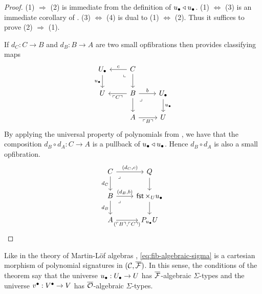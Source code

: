 \begin{proof}
  (1) $\Rightarrow$ (2) is immediate from the definition of ${u_\bullet} \triangleleft {u_\bullet}$.
  (1) $\Leftrightarrow$ (3) is an immediate corollary of
  .
  (3) $\Leftrightarrow$ (4) is dual to (1) $\Leftrightarrow$ (2).
  Thus it suffices to prove (2) $\Rightarrow$ (1).
  
  If $d_C : C \to B$ and $d_B : B \to A$
  are two small opfibrations
  then  provides classifying maps
  \[ \begin{tikzcd}
    \Ulow & C & \\
    \U & B & \Ulow \\
    & A & \U
    \arrow["\ulow"', from=1-1, to=2-1]
    \arrow["c"', from=1-2, to=1-1]
    \arrow["\lrcorner"{anchor=center, pos=0.125, rotate=-90}, draw=none, from=1-2, to=2-1]
    \arrow[from=1-2, to=2-2]
    \arrow["{\ulcorner C \urcorner}", from=2-2, to=2-1]
    \arrow["b", from=2-2, to=2-3]
    \arrow[from=2-2, to=3-2]
    \arrow["\lrcorner"{anchor=center, pos=0.125}, draw=none, from=2-2, to=3-3]
    \arrow["\ulow", from=2-3, to=3-3]
    \arrow["{\ulcorner B \urcorner}"', from=3-2, to=3-3]
  \end{tikzcd} \]
  By applying the universal property of polynomials from
  ,
  we have that the composition $d_B \circ d_A : C \to A$ 
  is a pullback of ${u_\bullet} \triangleleft {u_\bullet}$.
  Hence $d_B \circ d_A$ is also a small opfibration.
  \[\begin{tikzcd}
    C & Q \\
    B & {\fstProj \times_\U \ulow} \\
    A & {P_\ulow \U}
    \arrow["{(d_C, c)}", from=1-1, to=1-2]
    \arrow["{d_C}"', from=1-1, to=2-1]
    \arrow["\lrcorner"{anchor=center, pos=0.125}, draw=none, from=1-1, to=2-2]
    \arrow[from=1-2, to=2-2]
    \arrow["{(d_B, b)}", from=2-1, to=2-2]
    \arrow["{d_B}"', from=2-1, to=3-1]
    \arrow["\lrcorner"{anchor=center, pos=0.125}, draw=none, from=2-1, to=3-2]
    \arrow[from=2-2, to=3-2]
    \arrow["{({\ulcorner B \urcorner},{\ulcorner C \urcorner})}"', from=3-1, to=3-2]
  \end{tikzcd}\]
\end{proof}
Like in the theory of Martin-L\"of algebras \cite{awodey2025},
\cref{eq:fib-algebraic-sigma}
is a cartesian morphism of polynomial signatures in ${(\mathcal{C},{\overline{{\mathcal{F}}}})}$.
In this sense,
the conditions of the theorem say that
the universe ${u_\bullet} : {U_\bullet} \to U$ has ${\overline{{\mathcal{F}}}}$-algebraic $\Sigma$-types
and the universe ${v^\bullet} : {V^\bullet} \to V$ has ${\overline{{\mathcal{O}}}}$-algebraic $\Sigma$-types.

